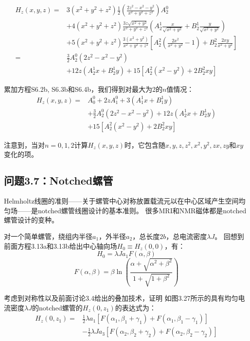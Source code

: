 \begin{equation}%
\begin{split}
H_z(x,y,z)=&3(x^2+y^2+z^2)\frac{1}{2}\left(\frac{2z^2-x^2-y^2}{x^2+y^2+z^2}\right)A_{2}^{0}\\
&+4(x^2+y^2+z^2)\frac{3z\sqrt{x^2+y^2}}{x^2+y^2+z^2}
\left(A_{2}^{1}\frac{x}{\sqrt{x^2+y^2}}+B_{2}^{1}\frac{y}{\sqrt{x^2+y^2}}\right)\\
&+5(x^2+y^2+z^2)\frac{3(x^2+y^2)}{x^2+y^2+z^2}\left[A_{2}^{2}(\frac{2x^2}{x^2+y^2}-1)+B_{2}^{2}\frac{2xy}{x^2+y^2}\right]\\
=&\frac{3}{2}A_{2}^{0}(2z^2-x^2-y^2)\\
&+12z(A_{2}^{1}x+B_{2}^{1}y)+15[A_{2}^{2}(x^2-y^2)+2B_{2}^{2}xy]
\end{split}
\end{equation}

累加方程S6.2b, S6.3b和S6.4b，我们得到对最大为2的$n$值情况：
\begin{equation}%
\begin{split}
H_z(x,y,z)=&A_{0}^{0}+2zA_{1}^{0}+3(A_{1}^{1}x+B_{1}^{1}y)\\
&+\frac{3}{2}A_{2}^{0}(2z^2-x^2-y^2)+12z(A_{2}^{1}x+B_{2}^{1}y)\\
&+15[A_{2}^{2}(x^2-y^2)+2B_{2}^{2}xy]
\end{split}
\end{equation}

注意到，当对$n=0,1,2$计算$H_z(x, y, z)$时，它包含随$x, y, z, z^2, x^2, y^2, zx, zy$和$xy$变化的项。
\newpage

\subsection{问题3.7：Notched螺管}
Helmholtz线圈的准则——关于螺管中心对称放置载流元以在中心区域产生空间均匀场——是notched螺管线圈设计的基本准则。
很多MRI和NMR磁体都是notched螺管设计的变种。

对一个简单螺管，绕组内半径$a_1$，外半径$a_2$，总长度$2b$，总电流密度$\lambda J$。
回想到前面方程3.13a和3.13b给出中心轴向场$H_0\equiv H_z(0, 0)$，有：
 \begin{equation}%
H_0=\lambda Ja_1F(\alpha,\beta)
\end{equation}
\begin{equation}%
F(\alpha,\beta)=\beta\ln\left(\frac{\alpha+\sqrt{\alpha^2+\beta^2}}{1+\sqrt{1+\beta^2}}\right)
\end{equation}

考虑到对称性以及前面讨论3.4给出的叠加技术，证明
如图3.27所示的具有均匀电流密度$\lambda J$的notched螺管的$H_z(0, z_1)$的表达式为：
\begin{equation}%
\begin{split}
H_z(0,z_1)=&\frac{1}{2}\lambda a_1\left[F(\alpha_1,\beta_1+\gamma_1)+F(\alpha_1,\beta_1-\gamma_1)\right]\\
&-\frac{1}{2}\lambda Ja_3
\left[F(\alpha_2,\beta_2+\gamma_2)+F(\alpha_2,\beta_2-\gamma_2)\right]
\end{split}
\end{equation}

